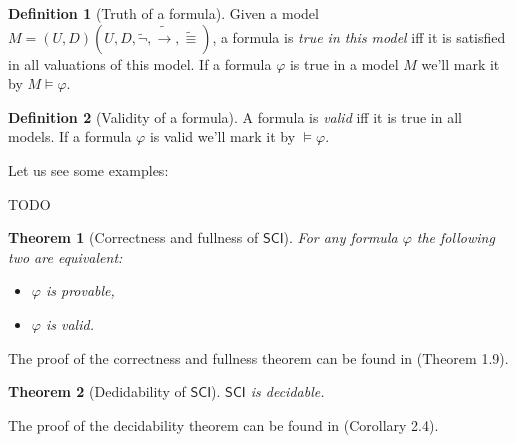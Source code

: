 \documentclass{article}
\newtheorem{theorem}{Theorem}
\theoremstyle{definition}
\newtheorem{definition}{Definition}[section]
\newcommand*{\id}{\equiv}
\newcommand*{\ra}{\rightarrow}
\newcommand{\SCI}{$\mathsf{SCI}$\xspace}
\begin{document}
\begin{definition}[Truth of a formula]
    Given a model $M = (U, D)(U, D, \tilde{\lnot}, \tilde{\ra}, \tilde{\id})$, a formula is \emph{true in this model} iff it is satisfied in all valuations of this model. If a formula $\varphi$ is true in a model $M$ we'll mark it by $M \models \varphi$.
\end{definition}

\begin{definition}[Validity of a formula]
    A formula is \emph{valid} iff it is true in all models. If a formula $\varphi$ is valid we'll mark it by $ \models \varphi$.
\end{definition}

Let us see some examples:

TODO

\begin{theorem}[Correctness and fullness of \SCI]
    For any formula $\varphi$ the following two are equivalent:
    \begin{itemize}
        \item $\varphi$ is provable,
        \item $\varphi$ is valid.
    \end{itemize}
\end{theorem}

The proof of the correctness and fullness theorem can be found in
\cite{suszko_bloom} (Theorem 1.9).

\begin{theorem}[Dedidability of \SCI]
    \SCI is decidable.
\end{theorem}

The proof of the decidability theorem can be found in \cite{suszko_bloom}
(Corollary 2.4).



\end{document}
